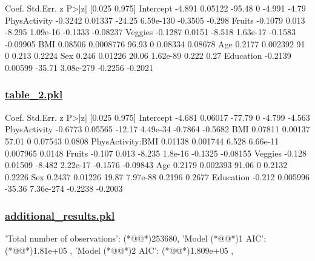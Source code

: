 \documentclass[11pt]{article}
\begin{document}
\begin{codeoutput}
               Coef.  Std.Err.      z      P>|z|  [0.025   0.975]
Intercept     -4.891   0.05122 -95.48          0  -4.991    -4.79
PhysActivity -0.3242   0.01337 -24.25  6.59e-130 -0.3505   -0.298
Fruits       -0.1079     0.013 -8.295   1.09e-16 -0.1333 -0.08237
Veggies      -0.1287    0.0151 -8.518   1.63e-17 -0.1583 -0.09905
BMI          0.08506 0.0008776  96.93          0 0.08334  0.08678
Age           0.2177  0.002392     91          0   0.213   0.2224
Sex            0.246   0.01226  20.06   1.62e-89   0.222     0.27
Education    -0.2139   0.00599 -35.71  3.08e-279 -0.2256  -0.2021
\end{codeoutput}\hypertarget{file-table-2-pkl}{}

\subsubsection*{\hyperlink{code-Data Analysis-table-2-pkl}{table\_2.pkl}}

\begin{codeoutput}
                   Coef. Std.Err.      z      P>|z|   [0.025   0.975]
Intercept         -4.681  0.06017 -77.79          0   -4.799   -4.563
PhysActivity     -0.6773  0.05565 -12.17   4.49e-34  -0.7864  -0.5682
BMI              0.07811  0.00137  57.01          0  0.07543   0.0808
PhysActivity:BMI 0.01138 0.001744  6.528   6.66e-11 0.007965   0.0148
Fruits            -0.107    0.013 -8.235    1.8e-16  -0.1325 -0.08155
Veggies           -0.128  0.01509 -8.482   2.22e-17  -0.1576 -0.09843
Age               0.2179 0.002393  91.06          0   0.2132   0.2226
Sex               0.2437  0.01226  19.87   7.97e-88   0.2196   0.2677
Education         -0.212 0.005996 -35.36  7.36e-274  -0.2238  -0.2003
\end{codeoutput}\hypertarget{file-additional-results-pkl}{}

\subsubsection*{\hyperlink{code-Data Analysis-additional-results-pkl}{additional\_results.pkl}}

\begin{codeoutput}
{
    'Total number of observations': (*@@*)253680,
    'Model (*@@*)1 AIC': (*@@*)1.81e+05          ,
    'Model (*@@*)2 AIC': (*@@*)1.809e+05         ,
}
\end{codeoutput}
\end{document}
